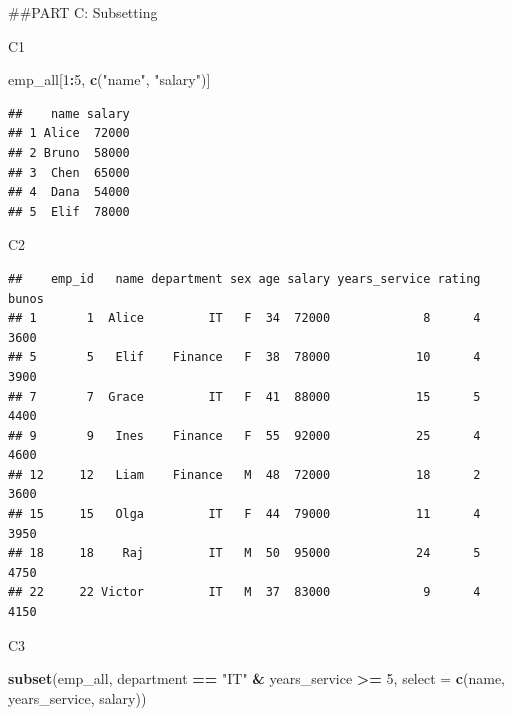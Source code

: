 \documentclass[
]{article}
\newenvironment{Shaded}{\begin{snugshade}}{\end{snugshade}}
\newcommand{\AttributeTok}[1]{\textcolor[rgb]{0.13,0.29,0.53}{#1}}
\newcommand{\DecValTok}[1]{\textcolor[rgb]{0.00,0.00,0.81}{#1}}
\newcommand{\FunctionTok}[1]{\textcolor[rgb]{0.13,0.29,0.53}{\textbf{#1}}}
\newcommand{\NormalTok}[1]{#1}
\newcommand{\SpecialCharTok}[1]{\textcolor[rgb]{0.81,0.36,0.00}{\textbf{#1}}}
\newcommand{\StringTok}[1]{\textcolor[rgb]{0.31,0.60,0.02}{#1}}
\begin{document}
\#\#PART C: Subsetting

C1

\begin{Shaded}
\begin{Highlighting}[]
\NormalTok{emp\_all[}\DecValTok{1}\SpecialCharTok{:}\DecValTok{5}\NormalTok{, }\FunctionTok{c}\NormalTok{(}\StringTok{"name"}\NormalTok{, }\StringTok{"salary"}\NormalTok{)]}
\end{Highlighting}
\end{Shaded}

\begin{verbatim}
##    name salary
## 1 Alice  72000
## 2 Bruno  58000
## 3  Chen  65000
## 4  Dana  54000
## 5  Elif  78000
\end{verbatim}

C2

\begin{Shaded}
\end{Shaded}

\begin{verbatim}
##    emp_id   name department sex age salary years_service rating bunos
## 1       1  Alice         IT   F  34  72000             8      4  3600
## 5       5   Elif    Finance   F  38  78000            10      4  3900
## 7       7  Grace         IT   F  41  88000            15      5  4400
## 9       9   Ines    Finance   F  55  92000            25      4  4600
## 12     12   Liam    Finance   M  48  72000            18      2  3600
## 15     15   Olga         IT   F  44  79000            11      4  3950
## 18     18    Raj         IT   M  50  95000            24      5  4750
## 22     22 Victor         IT   M  37  83000             9      4  4150
\end{verbatim}

C3

\begin{Shaded}
\begin{Highlighting}[]
\FunctionTok{subset}\NormalTok{(emp\_all, department }\SpecialCharTok{==} \StringTok{"IT"} \SpecialCharTok{\&}\NormalTok{ years\_service }\SpecialCharTok{\textgreater{}=} \DecValTok{5}\NormalTok{, }\AttributeTok{select =} \FunctionTok{c}\NormalTok{(name, years\_service, salary))}
\end{Highlighting}
\end{Shaded}
\end{document}
